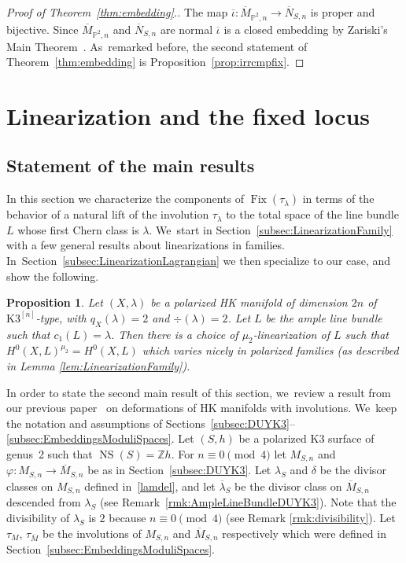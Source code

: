 \documentclass[11pt]{article}
\newcommand{\HK}{\textup{HK}\xspace}
\newcommand{\PP}{{\mathbb P}}\let\P\PP
\newcommand{\ZZ}{{\mathbb Z}}\let\Z\ZZ
\DeclareMathOperator{\Fix}{Fix}
\DeclareMathOperator{\NS}{NS}
\let\ov\overline
\let\phi\varphi
\newtheorem{prop}[lemm]{Proposition}
\theoremstyle{definition}
\def\citestacks#1{\cite[\href{https://stacks.math.columbia.edu/tag/#1}{Tag #1}]{stacks-project}}
\begin{document}
\begin{proof}[Proof of Theorem~\ref{thm:embedding}.]
The map $\overline{\iota}\colon\overline{M}_{\PP^2,n}\to\overline{N}_{S,n}$ is proper and bijective.
Since $\overline{M}_{\PP^2,n}$ and $\overline{N}_{S,n}$ are normal
$\overline{\iota}$ is a closed embedding by Zariski's Main Theorem~\citestacks{03GW}. As~remarked before, the second statement of Theorem~\ref{thm:embedding} is Proposition~\ref{prop:irrcmpfix}.
\end{proof}

\section{Linearization and the fixed locus}\label{sec:linearization}

\subsection{Statement of the main results}\label{subsec:negzerofiber}

In this section we characterize the components of $\Fix(\tau_\lambda)$ in terms of the behavior of a natural lift of the involution $\tau_\lambda$ to the total space of the line bundle $L$ whose first Chern class is $\lambda$. We~start in Section~\ref{subsec:LinearizationFamily} with a few general results about linearizations in families. In~Section~\ref{subsec:LinearizationLagrangian} we then specialize to our case, and show the following.

\begin{prop}\label{prop:ChoiceLinearizationFamily}
Let $(X,\lambda)$ be a polarized \HK manifold of dimension $2n$ of $\mathrm{K3}^{[n]}$-type, with $q_X(\lambda)=2$ and $\div(\lambda)=2$. Let $L$ be the ample line bundle such that \hbox{$c_1(L)=\lambda$}.
Then there is a choice of $\mu_2$-linearization of $L$ such that $H^0(X,L)^{\mu_2} = H^0(X,L)$ which varies nicely in polarized families (as described in Lemma \ref{lem:LinearizationFamily}).
\end{prop}

In order to state the second main result of this section, we~review a result from our previous paper~\cite{involutions1} on deformations of \HK manifolds with involutions. We~keep the notation and assumptions of Sections~\ref{subsec:DUYK3}--\ref{subsec:EmbeddingsModuliSpaces}.
Let $(S,h)$ be a polarized K3 surface of genus~2 such that $\NS(S)=\ZZ h$.
For $n\equiv 0 \pmod 4$ let $M_{S,n}$ and $\phi\colon M_{S,n}\to \overline{M}_{S,n}$ be as in Section~\ref{subsec:DUYK3}. Let $\lambda_S$ and $\delta$ be the divisor classes on $M_{S,n}$ defined in~\eqref{lamdel}, and let $\overline{\lambda}{}_S$ be the divisor class on $\overline{M}_{S,n}$ descended from $\lambda_S$ (see Remark~\ref{rmk:AmpleLineBundleDUYK3}).
Note that the divisibility of $\lambda_S$ is $2$ because $n\equiv 0 \pmod 4$ (see Remark \ref{rmk:divisibility}).
Let $\tau_M$, $\tau_{\ov{M}}$ be the involutions of $M_{S,n}$ and $\overline{M}_{S,n}$ respectively which were defined in Section~\ref{subsec:EmbeddingsModuliSpaces}.
\end{document}
